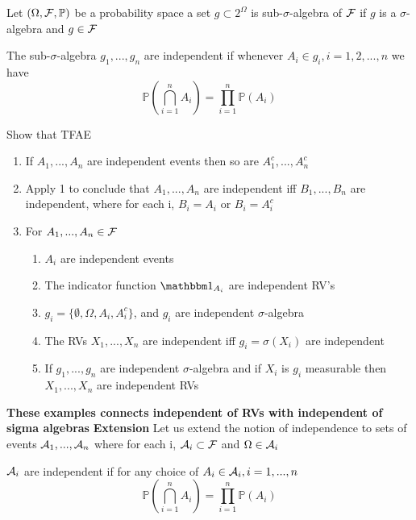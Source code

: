 \newpage
Let $(\Omega, \mathcal{F}, \mathbb{P})$ be a probability space a set $g \subset 2^{\Omega} $ is sub-$\sigma$-algebra of $\mathcal{F}$ if $g$ is a $\sigma$-algebra and $g\in \mathcal{F}$
\begin{dfn}
The sub-$\sigma$-algebra $g_1, ..., g_n$ are independent if whenever $A_i \in g_i, i = 1,2,..., n$ we have
\begin{equation*}
    \mathbb{P}(\bigcap\limits_{i=1}^n A_i) = \prod\limits_{i=1}^n \mathbb{P}(A_i)
\end{equation*}
\end{dfn}
\begin{ex}
Show that TFAE
\begin{enumerate}
    \item If $A_1, ..., A_n$ are independent events then so are $A_1^c, ...,A_n^c$
    \item Apply 1 to conclude that $A_1, ..., A_n$ are independent iff $B_1, ..., B_n$ are independent, where for each i, $B_i = A_i$ or $B_i = A_i^c$
    \item For $A_1, ..., A_n \in \mathcal{F}$
    \begin{enumerate}
        \item $A_i$ are independent events
        \item The indicator function $\I_{A_i}$ are independent RV's
        \item $g_i = \{\emptyset, \Omega, A_i, A_i^c\}$, and $g_i$ are independent $\sigma$-algebra
        \item The RVs $X_1, ..., X_n$ are independent iff $g_i = \sigma(X_i)$ are independent
        \item If $g_1, ..., g_n$ are independent $\sigma$-algebra and if $X_i$ is $g_i$ measurable then $X_1, ..., X_n$ are independent RVs
    \end{enumerate}
\end{enumerate}
\end{ex}
\textbf{These examples connects independent of RVs with independent of sigma algebras}
\vfill
\textbf{Extension}
Let us extend the notion of independence to sets of events $\mathcal{A}_1, ..., \mathcal{A}_n$ where for each i, $\mathcal{A}_i \subset \mathcal{F}$ and $\Omega \in \mathcal{A}_i$ \\
\begin{dfn}
$\mathcal{A}_i$ are independent if for any choice of $A_i\in \mathcal{A}_i, i =1,...,n$
\begin{equation*}
    \mathbb{P}(\bigcap\limits_{i=1}^n A_i) = \prod\limits_{i=1}^n \mathbb{P}(A_i)
\end{equation*}
\end{dfn}
